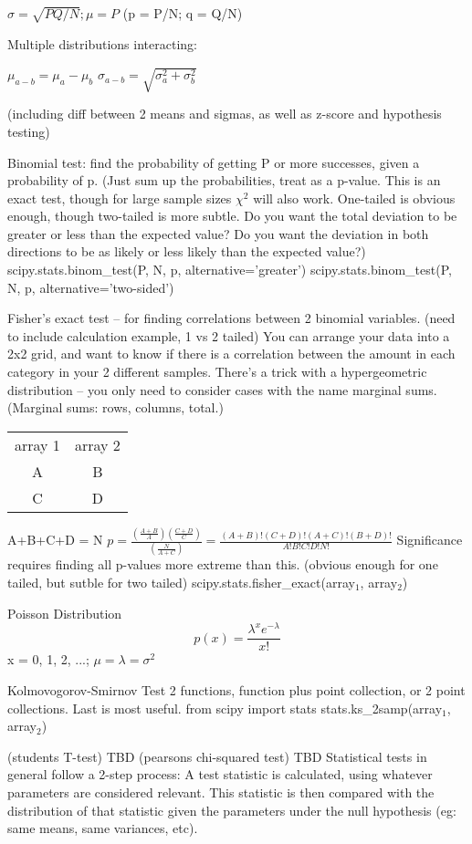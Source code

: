 \documentclass{slides}
\begin{document}
$\sigma = \sqrt{PQ/N}; \mu = P$ (p = P/N; q = Q/N)


Multiple distributions interacting:

$\mu_{a-b} = \mu_a - \mu_b$
$\sigma_{a-b} = \sqrt{\sigma_a^2 + \sigma_b^2}$


(including diff between 2 means and sigmas, as well as z-score and hypothesis testing)

Binomial test: find the probability of getting P or more successes, given a probability of p. (Just sum up the probabilities, treat as a p-value. This is an exact test, though for large sample sizes $\chi^2$ will also work. One-tailed is obvious enough, though two-tailed is more subtle. Do you want the total deviation to be greater or less than the expected value? Do you want the deviation in both directions to be as likely or less likely than the expected value?)
scipy.stats.binom\_test(P, N, p, alternative='greater')
scipy.stats.binom\_test(P, N, p, alternative='two-sided')

\newpage
Fisher's exact test -- for finding correlations between 2 binomial variables. (need to include calculation example, 1 vs 2 tailed)
You can arrange your data into a 2x2 grid, and want to know if there is a correlation between the amount in each category in your 2 different samples. There's a trick with a hypergeometric distribution -- you only need to consider cases with the name marginal sums. (Marginal sums: rows, columns, total.)

\begin{tabular}{c c}
 array 1 & array 2 \\
 A & B \\
 C & D \\
\end{tabular}
A+B+C+D = N
$p = \frac{(\frac{A+B}{A})(\frac{C+D}{C})}{(\frac{N}{A+C})} = \frac{(A+B)! (C+D)! (A+C)! (B+D)!}{A! B! C! D! N!}$
Significance requires finding all p-values more extreme than this. (obvious enough for one tailed, but sutble for two tailed)
scipy.stats.fisher\_exact(array$_1$, array$_2$)

\newpage
Poisson Distribution
\[
p(x) = \frac{\lambda^x e^{-\lambda}}{x!}
\]
x = 0, 1, 2, ...; $\mu = \lambda = \sigma^2$ 

Kolmovogorov-Smirnov Test
2 functions, function plus point collection, or 2 point collections. Last is most useful.
from scipy import stats 
stats.ks\_2samp(array$_1$, array$_2$)

\newpage
(students T-test) TBD
(pearsons chi-squared test) TBD
Statistical tests in general follow a 2-step process: A test statistic is calculated, using whatever parameters are considered relevant. This statistic is then compared with the distribution of that statistic given the parameters under the null hypothesis (eg: same means, same variances, etc).
\end{document}
